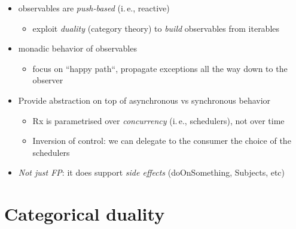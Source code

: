 \documentclass[10pt]{beamer}
\providecommand{\ie}{i.\,e.}
\begin{document}
\begin{frame}

	\begin{itemize}
				\item observables are \emph{push-based} (\ie, reactive)
			\begin{itemize}
		\item exploit \emph{duality} (category theory) to \emph{build} observables from iterables 
			\end{itemize}
		\item monadic behavior of observables 
			\begin{itemize}
				\item focus on ``happy path``, propagate exceptions all the way down to the observer 
			\end{itemize}
				\item Provide abstraction on top of asynchronous vs synchronous behavior 
			\begin{itemize}
		\item Rx is parametrised over \emph{concurrency} (\ie, schedulers), not over time
				\item Inversion of control: we can delegate to the consumer  the choice of the schedulers 
			\end{itemize}
		\item \emph{Not just FP}: it does support 
			\emph{side effects} (doOnSomething, Subjects, etc) 
	\end{itemize}

\end{frame}


\section{Categorical duality}
\end{document}
